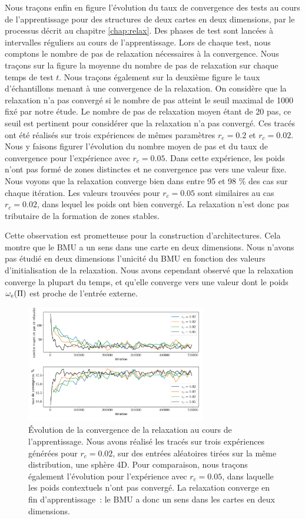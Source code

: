 \documentclass[../main]{subfiles}
\begin{document}
Nous traçons enfin en figure \label{fig:relax} l'évolution du taux de convergence des tests au cours de l'apprentissage pour des structures de deux cartes en deux dimensions, par le
processus décrit au chapitre \ref{chap:relax}.
Des phases de test sont lancées à intervalles réguliers au cours de l'apprentissage. Lors de chaque test, nous comptons le nombre de pas de relaxation nécessaires à la convergence. Nous traçons sur la figure la moyenne du nombre de pas de relaxation sur chaque temps de test $t$. 
Nous traçons également sur la deuxième figure le taux d'échantillons menant à une convergence de la relaxation. On considère que la relaxation n'a pas convergé si le nombre de pas atteint le seuil maximal de 1000 fixé par notre étude. Le nombre de pas de relaxation moyen étant de 20 pas, ce seuil est pertinent pour considérer que la relaxation n'a pas convergé. 
Ces tracés ont été réalisés sur trois expériences de mêmes paramètres $r_e=0.2$ et $r_c = 0.02$.
Nous y faisons figurer l'évolution du nombre moyen de pas et du taux de convergence pour l'expérience avec $r_c = 0.05$. Dans cette expérience, les poids n'ont pas formé de zones distinctes et ne convergence pas vers une valeur fixe.
Nous voyons que la relaxation converge bien dans entre 95 et 98 \% des cas sur chaque itération.
Les valeurs trouvées pour $r_c = 0.05$ sont similaires au cas $r_c = 0.02$, dans lequel les poids ont bien convergé. La relaxation n'est donc pas tributaire de la formation de zones stables.

Cette observation est prometteuse pour la construction d'architectures. Cela montre que le BMU a un sens dans une carte en deux dimensions. 
Nous n'avons pas étudié en deux dimensions l'unicité du BMU en fonction des valeurs d'initialisation de la relaxation. Nous avons cependant observé que la relaxation converge la plupart du temps, et qu'elle converge vers une valeur dont le poids $\omega_e(\Pi)$ est proche de l'entrée externe.

\begin{figure}
	\centering
	\includegraphics[width=0.7\textwidth]{conv_relax_2maps.pdf}
	\caption{\'Evolution de la convergence de la relaxation au cours de l'apprentissage. Nous avons réalisé les tracés sur trois expériences générées pour $r_c = 0.02$, sur des entrées aléatoires tirées sur la même distribution, une sphère 4D. Pour comparaison, nous traçons également l'évolution pour l'expérience avec $r_c = 0.05$, dans laquelle les poids contextuels n'ont pas convergé. La relaxation converge en fin d'apprentissage~: le BMU a donc un sens dans les cartes en deux dimensions. \label{fig:relax}}
\end{figure}
\end{document}
